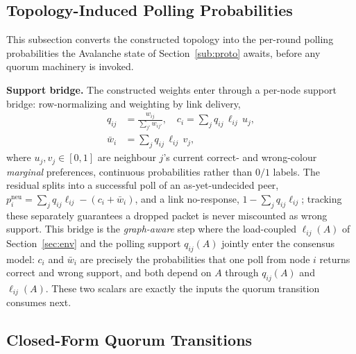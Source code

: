 \documentclass[journal]{IEEEtran}
\begin{document}
\subsection{Topology-Induced Polling Probabilities}\label{sub:support}

This subsection converts the constructed topology into the per-round polling
probabilities the Avalanche state of Section~\ref{sub:proto} awaits, before any
quorum machinery is invoked.

\textbf{Support bridge.} The constructed weights enter through a per-node support
bridge: row-normalizing and weighting by link delivery,
\begin{equation}
  \begin{aligned}
  q_{ij}&=\frac{w_{ij}}{\sum_{j'} w_{ij'}},\quad
  c_i=\sum_{j} q_{ij}\,\ell_{ij}\,u_j,\\
  \bar w_i&=\sum_{j} q_{ij}\,\ell_{ij}\,v_j,
  \end{aligned}
  \label{eq:support}
\end{equation}
where $u_j,v_j\in[0,1]$ are neighbour $j$'s current correct- and wrong-colour
\emph{marginal} preferences, continuous probabilities rather than $0/1$ labels.
The residual splits into a successful poll of an as-yet-undecided peer,
$p^{\mathrm{neu}}_i=\sum_j q_{ij}\ell_{ij}-(c_i+\bar w_i)$, and a link
no-response, $1-\sum_j q_{ij}\ell_{ij}$; tracking these separately guarantees a
dropped packet is never miscounted as wrong support. This bridge is the
\emph{graph-aware} step where the load-coupled $\ell_{ij}(A)$ of
Section~\ref{sec:env} and the polling support $q_{ij}(A)$ jointly enter the
consensus model: $c_i$ and $\bar w_i$ are precisely the probabilities that one
poll from node $i$ returns correct and wrong support, and both depend on $A$
through $q_{ij}(A)$ and $\ell_{ij}(A)$. These two scalars are exactly the inputs
the quorum transition consumes next.

\subsection{Closed-Form Quorum Transitions}\label{sub:quorum}
\end{document}
